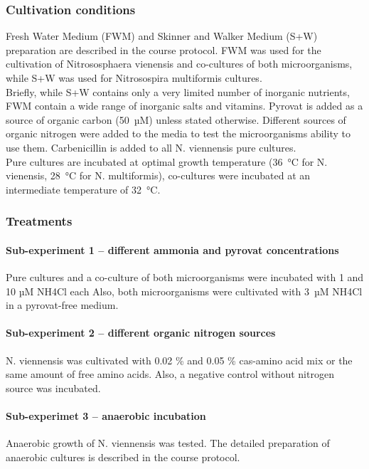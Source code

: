 \documentclass[a4paper,10pt]{article}
\begin{document}
\subsubsection{Cultivation conditions}
Fresh Water Medium (FWM) and Skinner and Walker Medium (S+W) preparation are described in the course protocol. FWM was used for the cultivation of Nitrososphaera vienensis and co-cultures of both microorganisms, while S+W was used for Nitrosospira multiformis cultures. 
\\Briefly, while S+W contains only a very limited number of inorganic nutrients, FWM contain a wide range of inorganic salts and vitamins. Pyrovat is added as a source of organic carbon (50 µM) unless stated otherwise. Different sources of organic nitrogen were added to the media to test the microorganisms ability to use them. Carbenicillin is added to all N. viennensis pure cultures.
\\Pure cultures are incubated at optimal growth temperature (36 °C for N. vienensis, 28 °C for N. multiformis), co-cultures were incubated at an intermediate temperature of 32 °C.

\subsubsection{Treatments}
\paragraph{Sub-experiment 1 – different ammonia and pyrovat concentrations}
Pure cultures and a co-culture of both microorganisms were incubated with 1 and 10 µM NH4Cl each  Also, both microorganisms were cultivated with 3 µM NH4Cl in a pyrovat-free medium.

\paragraph{Sub-experiment 2 – different organic nitrogen sources}
N. viennensis was cultivated with 0.02 \% and 0.05 \% cas-amino acid mix or the same amount of free amino acids. Also, a negative control without nitrogen source was incubated. 

\paragraph{Sub-experimet 3 – anaerobic incubation}
Anaerobic growth of N. viennensis was tested. The detailed preparation of anaerobic cultures is described in the course protocol. 
\end{document}

